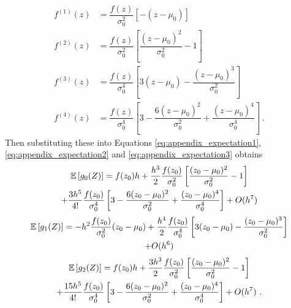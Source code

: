 \begin{align}
f^{(1)}(z) &= \dfrac{f(z)}{\sigma_0^2}\left[-(z-\mu_0)\right]
\\
f^{(2)}(z)&=\dfrac{f(z)}{\sigma_0^2}\left[
  \dfrac{(z-\mu_0)^2}{\sigma_0^2}-1
\right]
\\
f^{(3)}(z) &= \dfrac{f(z)}{\sigma_0^4}
\left[
3(z-\mu_0)-\dfrac{(z-\mu_0)^3}{\sigma_0^2}
\right]
\\
f^{(4)}(z) &= \dfrac{f(z)}{\sigma_0^4}
\left[
  3 - \dfrac{6(z-\mu_0)^2}{\sigma_0^2} + \dfrac{(z-\mu_0)^4}{\sigma_0^4}
\right] \ .
\end{align}
Then substituting these into Equations \ref{eq:appendix_expectation1}, \ref{eq:appendix_expectation2} and \ref{eq:appendix_expectation3} obtains
\begin{multline}
\operatorname{\mathbb{E}}\left[g_0(Z)\right]
=
f(z_0)h
+
\dfrac{h^3}{2} \dfrac{f(z_0)}{\sigma_0^2}\left[
  \dfrac{(z_0-\mu_0)^2}{\sigma_0^2}-1
\right]
\\ +
\dfrac{3h^5}{4!} \dfrac{f(z_0)}{\sigma_0^4}
\left[
  3 - \dfrac{6(z_0-\mu_0)^2}{\sigma_0^2} + \dfrac{(z_0-\mu_0)^4}{\sigma_0^4}
\right]
+O(h^7)
\label{eq:appendix_expectationExpand1}
\end{multline}
\begin{multline}
\operatorname{\mathbb{E}}\left[g_1(Z)\right]
=
-h^2\dfrac{f(z_0)}{\sigma_0^2}(z_0-\mu_0)
+
\dfrac{h^4}{2} \dfrac{f(z_0)}{\sigma_0^4}
\left[
3(z_0-\mu_0)-\dfrac{(z_0-\mu_0)^3}{\sigma_0^2}
\right]
\\
+O(h^6)
\label{eq:appendix_expectationExpand2}
\end{multline}
\begin{multline}
\operatorname{\mathbb{E}}\left[g_2(Z)\right]
=
f(z_0)h
+
\dfrac{3h^3}{2} \dfrac{f(z_0)}{\sigma_0^2}\left[
  \dfrac{(z_0-\mu_0)^2}{\sigma_0^2}-1
\right]
\\ +
\dfrac{15h^5}{4!} \dfrac{f(z_0)}{\sigma_0^4}
\left[
  3 - \dfrac{6(z_0-\mu_0)^2}{\sigma_0^2} + \dfrac{(z_0-\mu_0)^4}{\sigma_0^4}
\right]
+O(h^7) \ .
\label{eq:appendix_expectationExpand3}
\end{multline}

